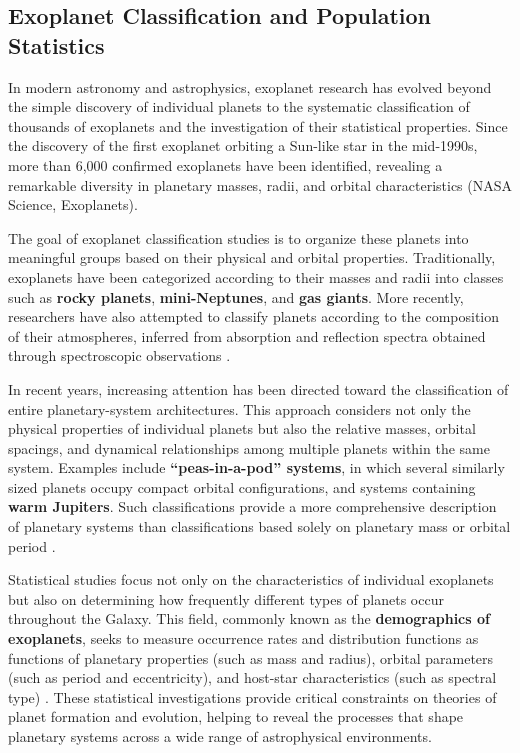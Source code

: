 \subsection{Exoplanet Classification and Population Statistics}\label{exoplanet-classification-and-population-statistics}

In modern astronomy and astrophysics, exoplanet research has evolved beyond the simple discovery of individual planets to the systematic classification of thousands of exoplanets and the investigation of their statistical properties. Since the discovery of the first exoplanet orbiting a Sun-like star in the mid-1990s, more than 6,000 confirmed exoplanets have been identified, revealing a remarkable diversity in planetary masses, radii, and orbital characteristics (NASA Science, Exoplanets).

The goal of exoplanet classification studies is to organize these planets into meaningful groups based on their physical and orbital properties. Traditionally, exoplanets have been categorized according to their masses and radii into classes such as \textbf{rocky planets}, \textbf{mini-Neptunes}, and \textbf{gas giants}. More recently, researchers have also attempted to classify planets according to the composition of their atmospheres, inferred from absorption and reflection spectra obtained through spectroscopic observations \cite{kopparapu2018}.

In recent years, increasing attention has been directed toward the classification of entire planetary-system architectures. This approach considers not only the physical properties of individual planets but also the relative masses, orbital spacings, and dynamical relationships among multiple planets within the same system. Examples include \textbf{``peas-in-a-pod'' systems}, in which several similarly sized planets occupy compact orbital configurations, and systems containing \textbf{warm Jupiters}. Such classifications provide a more comprehensive description of planetary systems than classifications based solely on planetary mass or orbital period \cite{howe2025}.

Statistical studies focus not only on the characteristics of individual exoplanets but also on determining how frequently different types of planets occur throughout the Galaxy. This field, commonly known as the \textbf{demographics of exoplanets}, seeks to measure occurrence rates and distribution functions as functions of planetary properties (such as mass and radius), orbital parameters (such as period and eccentricity), and host-star characteristics (such as spectral type) \cite{gaudi2021}. These statistical investigations provide critical constraints on theories of planet formation and evolution, helping to reveal the processes that shape planetary systems across a wide range of astrophysical environments.


